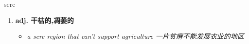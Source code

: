 
\begin{frame}
{\huge sere}
\begin{center}
\begin{enumerate}\Large
  \item \textbf{adj. 干枯的,凋萎的}
  \begin{itemize}
    \item \em{\Large{a sere region that can't support agriculture 一片贫瘠不能发展农业的地区}}
  \end{itemize}
\end{enumerate}
\end{center}
\end{frame}
